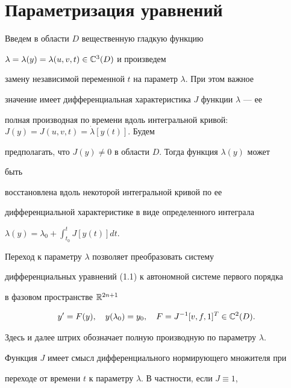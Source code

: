  


\section{Параметризация уравнений} 


 


Введем в области $D$ вещественную гладкую функцию 


$\lambda=\lambda(y)=\lambda(u,v,t)\in\Bbb C^3(D)$ и произведем 


замену независимой переменной $t$ на параметр $\lambda$. При этом важное 


значение имеет дифференциальная характеристика $J$ функции $\lambda$ --- ее 


полная производная по времени вдоль интегральной кривой: $J(y)=J(u,v,t)= 


\Dot\lambda[y(t)]$. Будем 


предполагать, что $J(y)\ne0$ в области $D$. Тогда функция $\lambda(y)$ может 


быть 


восстановлена вдоль некоторой интегральной кривой по ее 


дифференциальной характеристике в виде определенного интеграла 


$\lambda(y)=\lambda_0+\displaystyle\int^t_{t_0}J[y(t)]dt$. 


 


Переход к параметру $\lambda$ позволяет преобразовать систему 


дифференциальных уравнений (1.1) к автономной системе первого порядка 


в фазовом пространстве $\Bbb R^{2n+1}$ 


\begin{equation} 


y'=F(y),\quad y(\lambda_0)=y_0,\quad 


F=J^{-1}[v,f,1]^T\in\Bbb C^2(D). 


\end{equation} 


Здесь и далее штрих обозначает полную производную по параметру $\lambda$. 


 


Функция $J$ имеет смысл дифференциального нормирующего множителя при 


переходе от времени $t$ к параметру $\lambda$. В частности, если $J\equiv1$, 


